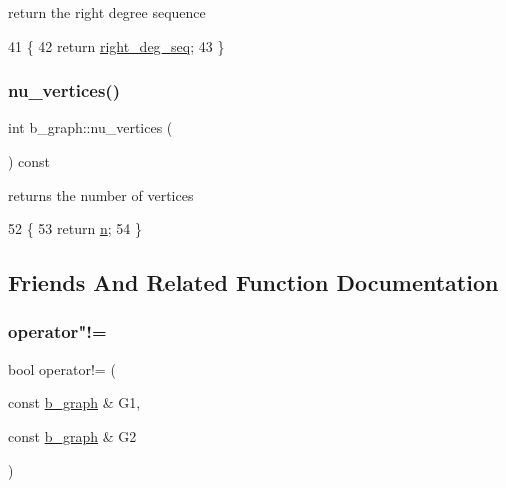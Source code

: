 return the right degree sequence 


\begin{DoxyCode}
41 \{
42   \textcolor{keywordflow}{return} \hyperlink{classb__graph_ae4c875ed6a583a78f38dfe958f20fad5}{right\_deg\_seq};
43 \}
\end{DoxyCode}
\mbox{\label{classb__graph_a69ff77c254af827afbfe52934b6736a5}} 
\subsubsection{\texorpdfstring{nu\+\_\+vertices()}{nu\_vertices()}}
{\footnotesize\ttfamily int b\+\_\+graph\+::nu\+\_\+vertices (\begin{DoxyParamCaption}{ }\end{DoxyParamCaption}) const}



returns the number of vertices 


\begin{DoxyCode}
52 \{
53   \textcolor{keywordflow}{return} \hyperlink{classb__graph_a9e211d40c1799bc9b125de472ff06642}{n};
54 \}
\end{DoxyCode}


\subsection{Friends And Related Function Documentation}
\mbox{\label{classb__graph_ab90cd92a2e8f077e4ae18c568bcddd1a}} 
\subsubsection{\texorpdfstring{operator"!=}{operator!=}}
{\footnotesize\ttfamily bool operator!= (\begin{DoxyParamCaption}\item[{const \hyperlink{classb__graph}{b\+\_\+graph} \&}]{G1,  }\item[{const \hyperlink{classb__graph}{b\+\_\+graph} \&}]{G2 }\end{DoxyParamCaption})\hspace{0.3cm}{\ttfamily [friend]}}




